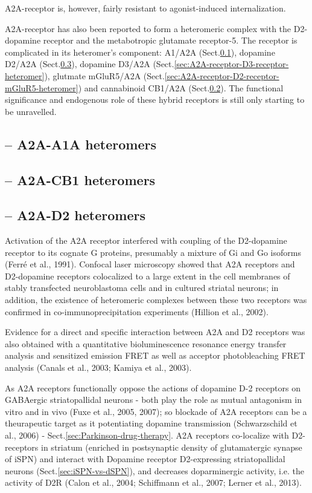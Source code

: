 A2A-receptor is, however, fairly resistant to agonist-induced
internalization.

A2A-receptor has also been reported to form a heteromeric complex with the
D2-dopamine receptor and the metabotropic glutamate receptor-5. The receptor is
complicated in its heteromer's component: A1/A2A
(Sect.\ref{sec:A2A-receptor-A1A-receptor-heteromer}), dopamine D2/A2A
(Sect.\ref{sec:A2A-receptor-D2-receptor-heteromer}), dopamine D3/A2A
(Sect.\ref{sec:A2A-receptor-D3-receptor-heteromer}), glutmate mGluR5/A2A
(Sect.\ref{sec:A2A-receptor-D2-receptor-mGluR5-heteromer}) and cannabinoid
CB1/A2A (Sect.\ref{sec:A2A-receptor-CB1-receptor-heteromer}).
The functional significance and endogenous role of these hybrid receptors is
still only starting to be unravelled.

\subsection{-- A2A-A1A heteromers}
\label{sec:A2A-receptor-A1A-receptor-heteromer}

\subsection{-- A2A-CB1 heteromers}
\label{sec:A2A-receptor-CB1-receptor-heteromer}

\subsection{-- A2A-D2 heteromers}
\label{sec:A2A-receptor-D2-receptor-heteromer}

Activation of the A2A receptor interfered with coupling of the D2-dopamine
receptor to its cognate G proteins, presumably a mixture of Gi and Go isoforms
(Ferré et al., 1991).
Confocal laser microscopy showed that A2A receptors and D2-dopamine receptors
colocalized to a large extent in the cell membranes of stably transfected
neuroblastoma cells and in cultured striatal neurons; in addition, the existence
of heteromeric complexes between these two receptors was confirmed in
co-immunoprecipitation experiments (Hillion et al., 2002).    

Evidence for a direct and specific interaction between A2A and D2 receptors was
also obtained with a quantitative bioluminescence resonance energy transfer
analysis and sensitized emission FRET as well as acceptor photobleaching FRET
analysis (Canals et al., 2003; Kamiya et al., 2003).   


As A2A receptors functionally oppose the actions of dopamine D-2 receptors on
GABAergic striatopallidal neurons - both play the role as mutual antagonism in
vitro and in vivo (Fuxe et al., 2005, 2007); so blockade of A2A receptors can be
a theurapeutic target as it potentiating dopamine transmission (Schwarzschild et
al., 2006) - Sect.\ref{sec:Parkinson-drug-therapy}. A2A receptors co-localize
with D2-receptors in striatum (enriched in postsynaptic density of glutamatergic synapse of iSPN) and interact with
Dopamine receptor D2-expressing striatopallidal neurons
(Sect.\ref{sec:iSPN-vs-dSPN}), and decreases doparminergic activity, i.e.  the
activity of D2R (Calon et al., 2004; Schiffmann et al., 2007; Lerner et al.,
2013).



